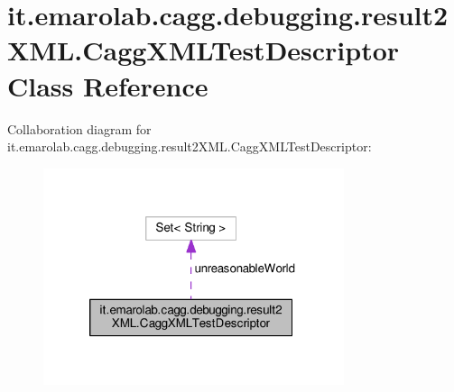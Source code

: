 \hypertarget{classit_1_1emarolab_1_1cagg_1_1debugging_1_1result2XML_1_1CaggXMLTestDescriptor}{\section{it.\-emarolab.\-cagg.\-debugging.\-result2\-X\-M\-L.\-Cagg\-X\-M\-L\-Test\-Descriptor Class Reference}
\label{classit_1_1emarolab_1_1cagg_1_1debugging_1_1result2XML_1_1CaggXMLTestDescriptor}
}


Collaboration diagram for it.\-emarolab.\-cagg.\-debugging.\-result2\-X\-M\-L.\-Cagg\-X\-M\-L\-Test\-Descriptor\-:\nopagebreak
\begin{figure}[H]
\begin{center}
\leavevmode
\includegraphics[width=250pt]{classit_1_1emarolab_1_1cagg_1_1debugging_1_1result2XML_1_1CaggXMLTestDescriptor__coll__graph}
\end{center}
\end{figure}
